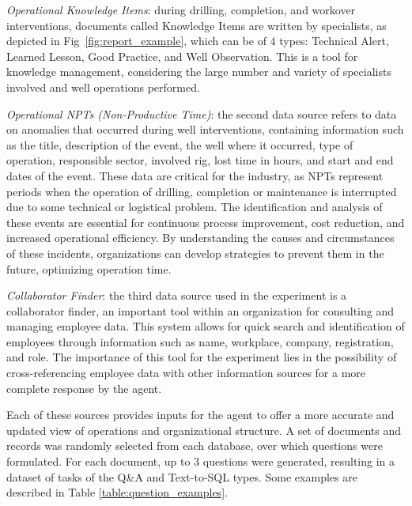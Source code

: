             \emph{Operational Knowledge Items}: during drilling, completion, and workover interventions, documents called Knowledge Items are written by specialists, as depicted in Fig~\ref{fig:report_example}, which can be of 4 types: Technical Alert, Learned Lesson, Good Practice, and Well Observation. 
            This is a tool for knowledge management, considering the large number and variety of specialists involved and well operations performed.
            
            \emph{Operational NPTs (Non-Productive Time)}: the second data source refers to data on anomalies that occurred during well interventions, containing information such as the title, description of the event, the well where it occurred, type of operation, responsible sector, involved rig, lost time in hours, and start and end dates of the event. 
            These data are critical for the industry, as NPTs represent periods when the operation of drilling, completion or maintenance is interrupted due to some technical or logistical problem. The identification and analysis of these events are essential for continuous process improvement, cost reduction, and increased operational efficiency. By understanding the causes and circumstances of these incidents, organizations can develop strategies to prevent them in the future, optimizing operation time.
            
            \emph{Collaborator Finder}: the third data source used in the experiment is a collaborator finder, an important tool within an organization for consulting and managing employee data. 
            This system allows for quick search and identification of employees through information such as name, workplace, company, registration, and role. The importance of this tool for the experiment lies in the possibility of cross-referencing employee data with other information sources for a more complete response by the agent.
            
            Each of these sources provides inputs for the agent to offer a more accurate and updated view of operations and organizational structure.
            A set of documents and records was randomly selected from each database, over which questions were formulated. For each document, up to 3 questions were generated, resulting in a dataset of tasks of the Q\&A and Text-to-SQL types. Some examples are described in Table \ref{table:question_examples}.


